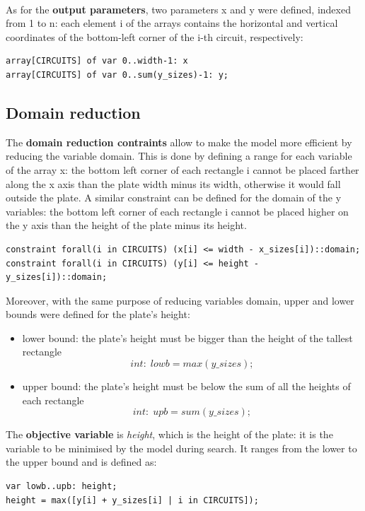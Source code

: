 \\

As for the \textbf{output parameters}, two parameters x and y were defined, indexed from 1 to n: each element i of the arrays contains the horizontal and vertical coordinates of the bottom-left corner of the i-th circuit, respectively:

\begin{verbatim}
array[CIRCUITS] of var 0..width-1: x
array[CIRCUITS] of var 0..sum(y_sizes)-1: y;
\end{verbatim}

\subsection{Domain reduction}

The \textbf{domain reduction contraints} allow to make the model more efficient by reducing the variable domain. This is done by defining a range for each variable of the array x: the bottom left corner of each rectangle i cannot be placed farther along the x axis than the plate width minus its width, otherwise it would fall outside the plate. A similar constraint can be defined for the domain of the y variables: the bottom left corner of each rectangle i cannot be placed higher on the y axis than the height of the plate minus its height.

\begin{verbatim}
constraint forall(i in CIRCUITS) (x[i] <= width - x_sizes[i])::domain; 
constraint forall(i in CIRCUITS) (y[i] <= height - y_sizes[i])::domain;
\end{verbatim}

Moreover, with the same purpose of reducing variables domain, upper and lower bounds were defined for the plate's height:
\begin{itemize}
    \item lower bound: the plate's height must be bigger than the height of the tallest rectangle
    \[ int: \; lowb = max(y\_sizes); \]
    \item upper bound: the plate's height must be below the sum of all the heights of each rectangle
    \[int: \; upb = sum(y\_sizes); \]
\end{itemize}


The \textbf {objective variable} is \textit{height}, which is the height of the plate: it is the variable to be minimised by the model during search. It ranges from the lower to the upper bound and is defined as:

\begin{verbatim}
var lowb..upb: height;
height = max([y[i] + y_sizes[i] | i in CIRCUITS]);
\end{verbatim}

